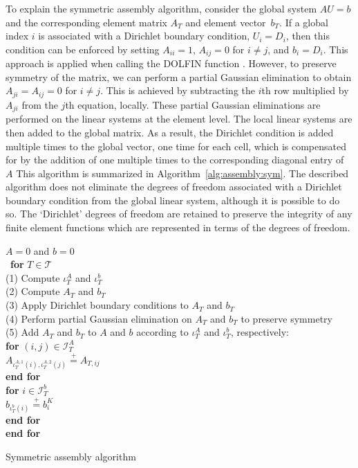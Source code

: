 To explain the symmetric assembly algorithm, consider the global
system $AU=b$ and the corresponding element matrix $A_T$ and
element vector~$b_T$. If a global index $i$ is associated with a
Dirichlet boundary condition, $U_i=D_i$, then this condition can be
enforced by setting $A_{ii} = 1$, $A_{ij} = 0$ for $i \neq j$, and
$b_i = D_i$. This approach is applied when calling the DOLFIN
function . However, to preserve symmetry of the
matrix, we can perform a partial Gaussian elimination to obtain
$A_{ji} = A_{ij} = 0$ for $i \ne j$.  This is achieved by subtracting
the $i$th row multiplied by $A_{ji}$ from the $j$th equation,
locally. These partial Gaussian eliminations are performed on the
linear systems at the element level. The local linear systems are then
added to the global matrix. As a result, the Dirichlet condition is
added multiple times to the global vector, one time for each cell,
which is compensated for by the addition of one multiple times to the
corresponding diagonal entry of~$A$ This algorithm is summarized in
Algorithm~\ref{alg:assembly:sym}. The described algorithm does not
eliminate the degrees of freedom associated with a Dirichlet boundary
condition from the global linear system, although it is possible to do
so. The `Dirichlet' degrees of freedom are retained to preserve the
integrity of any finite element functions which are represented in
terms of the degrees of freedom.

\begin{algorithm}
  \begin{tabbing}
    $A = 0$ and $b = 0$\\\
    \textbf{for}  {$T \in \mathcal{T}$}\\
    \tab (1) Compute $\iota^A_T$ and $\iota^b_T$  \\
    \tab (2) Compute $A_T$ and $b_T$ \\
    \tab (3) Apply Dirichlet boundary conditions to $A_T$ and $b_T$ \\
    \tab (4) Perform partial Gaussian elimination on $A_T$ and $b_T$ to preserve symmetry \\
    \tab (5) Add $A_T$ and $b_T$ to $A$ and $b$ according to $\iota^A_T$ and $\iota^b_T$, respectively: \\
    \tab \textbf{for} $(i,j) \in \mathcal{I}^A_T$ \\
    \tab \tab $A_{\iota^{A,1}_T(i), \iota^{A,2}_T(j)} \stackrel{+}{=} A_{T,ij}$ \\
    \tab \textbf{end for} \\
    \tab \textbf{for} $i \in \mathcal{I}^b_T$  \\
    \tab \tab $b_{\iota^b_T(i)} \stackrel{+}{=} b^K_i$  \\
    \tab \textbf{end for} \\
    \textbf{end for}
  \end{tabbing}
  \label{alg:assembly:sym}
  \caption{Symmetric assembly algorithm}
\end{algorithm}

